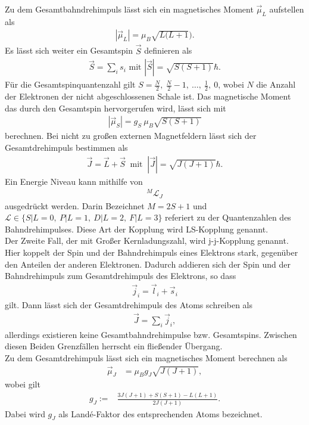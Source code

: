 Zu dem Gesamtbahndrehimpuls lässt sich ein magnetisches Moment $\vec{\mu}_L$ aufstellen als
\begin{align}
	|\vec{\mu}_L|=\mu_B\sqrt{L(L+1}).
\end{align}
Es lässt sich weiter ein Gesamtspin $\vec{S}$ definieren als
\begin{align}
	\vec{S}=\sum_is_i \text{ mit } |\vec{S}|=\sqrt{S(S+1)}\hbar.
\end{align}
Für die Gesamtspinquantenzahl gilt $S=\frac{N}{2},\ \frac{N}{2}-1 ,\ \dots,\ \frac{1}{2},\ 0$, wobei $N$ die Anzahl der Elektronen der nicht abgeschlossenen Schale ist.
Das magnetische Moment das durch den Gesamtspin hervorgerufen wird, lässt sich mit
\begin{align}
	|\vec{\mu}_S|=g_S\ \mu_B\sqrt{S(S+1)}
\end{align}
berechnen.
Bei nicht zu großen externen Magnetfeldern lässt sich der Gesamtdrehimpuls bestimmen als
\begin{align}
	\vec{J}=\vec{L}+\vec{S} \ \text{ mit }\ |\vec{J}|=\sqrt{J(J+1)}\hbar.
\end{align}
Ein Energie Niveau kann mithilfe von
\begin{align}
	{}^M\mathcal{L}_J
\end{align}
ausgedrückt werden.
Darin Bezeichnet $M=2S+1$ und $\mathcal{L}\in\{S|L=0,\ P|L=1,\ D|L=2,\ F|L=3\}$ referiert zu der Quantenzahlen des Bahndrehimpulses.
Diese Art der Kopplung wird LS-Kopplung genannt.\\
Der Zweite Fall, der mit Großer Kernladungszahl, wird j-j-Kopplung genannt.
Hier koppelt der Spin und der Bahndrehimpuls eines Elektrons stark, gegenüber den Anteilen der anderen Elektronen.
Dadurch addieren sich der Spin und der Bahndrehimpuls zum Gesamtdrehimpuls des Elektrons, so dass
\begin{align}
	\vec{j}_i=\vec{l}_i+\vec{s}_i
\end{align}
gilt.
Dann lässt sich der Gesamtdrehimpuls des Atoms schreiben als
\begin{align}
	\vec{J}=\sum_i\vec{j}_i,
\end{align}
allerdings existieren keine Gesamtbahndrehimpulse bzw. Gesamtspins.
Zwischen diesen Beiden Grenzfällen herrscht ein fließender Übergang.\\
Zu dem Gesamtdrehimpuls lässt sich ein magnetisches Moment berechnen als
\begin{align}
	\vec{\mu}_J&=\mu_Bg_J\sqrt{J(J+1)},
\end{align}
wobei gilt
\begin{align}
		g_J:=&\frac{3J(J+1)+S(S+1)-L(L+1)}{2J(J+1)}.
\end{align}
Dabei wird $g_J$ als Landé-Faktor des entsprechenden Atoms bezeichnet.
